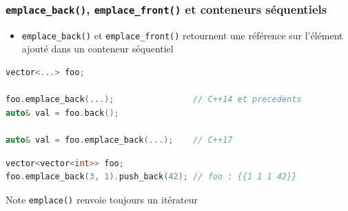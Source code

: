 \documentclass[C++.tex]{subfiles}
\begin{document}
\begin{frame}[fragile]
	\frametitle{\lstinline|emplace_back()|, \lstinline|emplace_front()| et conteneurs séquentiels}
	\begin{itemize}
		\item \lstinline|emplace_back()| et \lstinline|emplace_front()| retournent une référence sur l'élément ajouté dans un conteneur séquentiel
	\end{itemize}

	\begin{lstlisting}[language=C++]
vector<...> foo;

foo.emplace_back(...);                // C++14 et precedents
auto& val = foo.back();

auto& val = foo.emplace_back(...);    // C++17\end{lstlisting}

	\begin{lstlisting}[language=C++]
vector<vector<int>> foo;
foo.emplace_back(3, 1).push_back(42); // foo : {{1 1 1 42}}\end{lstlisting}


	\begin{block}{Note}
		\lstinline|emplace()| renvoie toujours un itérateur
	\end{block}
\end{frame}
\end{document}
